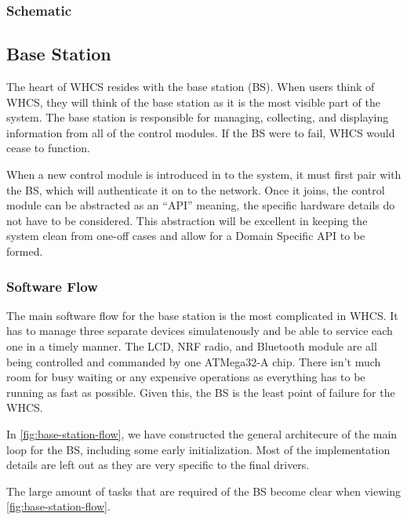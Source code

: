 \subsubsection{Schematic}

\subsection{Base Station}
The heart of WHCS resides with the base station (BS). When users think of WHCS, they
will think of the base station as it is the most visible part of the system.
The base station is responsible for managing, collecting, and displaying
information from all of the control modules. If the BS were to fail, WHCS
would cease to function.

When a new control module is introduced in to the system, it must first pair
with the BS, which will authenticate it on to the network. Once it joins, the
control module can be abstracted as an ``API'' meaning, the specific hardware
details do not have to be considered. This abstraction will be excellent in
keeping the system clean from one-off cases and allow for a Domain Specific API
to be formed.

\subsubsection{Software Flow}
The main software flow for the base station is the most complicated in WHCS. It
has to manage three separate devices simulatenously and be able to service each
one in a timely manner. The LCD, NRF radio, and Bluetooth module are all being
controlled and commanded by one ATMega32-A chip. There isn't much room for busy
waiting or any expensive operations as everything has to be running as fast as
possible. Given this, the BS is the least point of failure for the WHCS.

In \autoref{fig:base-station-flow}, we have constructed the general architecure
of the main loop for the BS, including some early initialization. Most of the
implementation details are left out as they are very specific to the final
drivers.


The large amount of tasks that are required of the BS become clear when viewing
\autoref{fig:base-station-flow}.

